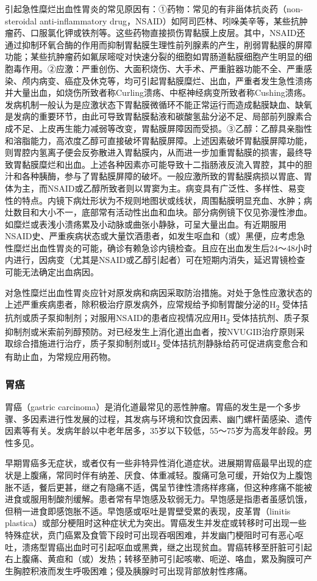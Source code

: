 引起急性糜烂出血性胃炎的常见原因有：①药物：常见的有非甾体抗炎药（non-steroidal
anti-inflammatory
drug，NSAID）如阿司匹林、吲哚美辛等，某些抗肿瘤药、口服氯化钾或铁剂等。这些药物直接损伤胃黏膜上皮层。其中，NSAID还通过抑制环氧合酶的作用而抑制胃黏膜生理性前列腺素的产生，削弱胃黏膜的屏障功能；某些抗肿瘤药如氟尿嘧啶对快速分裂的细胞如胃肠道黏膜细胞产生明显的细胞毒作用。②应激：严重创伤、大面积烧伤、大手术、严重脏器功能不全、严重感染、颅内病变、癌症及休克等，均可引起胃黏膜糜烂、出血，严重者发生急性溃疡并大量出血，如烧伤所致者称Curling溃疡、中枢神经病变所致者称Cushing溃疡。发病机制一般认为是应激状态下胃黏膜微循环不能正常运行而造成黏膜缺血、缺氧是发病的重要环节，由此可导致胃黏膜黏液和碳酸氢盐分泌不足、局部前列腺素合成不足、上皮再生能力减弱等改变，胃黏膜屏障因而受损。③乙醇：乙醇具亲脂性和溶脂能力，高浓度乙醇可直接破坏胃黏膜屏障。上述因素破坏胃黏膜屏障功能，则胃腔内氢离子便会反弥散进入胃黏膜内，从而进一步加重胃黏膜的损害，最终导致胃黏膜糜烂和出血。上述各种因素亦可能导致十二指肠液反流入胃腔，其中的胆汁和各种胰酶，参与了胃黏膜屏障的破坏。一般应激所致的胃黏膜病损以胃底、胃体为主，而NSAID或乙醇所致者则以胃窦为主。病变具有广泛性、多样性、易变性的特点。内镜下病灶形状为不规则地图状或线状，周围黏膜明显充血、水肿；病灶数目和大小不一，底部常有活动性出血和血块。部分病例镜下仅见弥漫性渗血。如糜烂或表浅小溃疡累及小动脉或曲张小静脉，可呈大量出血。有近期服用NSAID史、严重疾病状态或大量饮酒患者，如发生呕血和（或）黑便，应考虑急性糜烂出血性胃炎的可能，确诊有赖急诊内镜检查。且应在出血发生后24～48小时内进行，因病变（尤其是NSAID或乙醇引起者）可在短期内消失，延迟胃镜检查可能无法确定出血病因。

对急性糜烂出血性胃炎应针对原发病和病因采取防治措施。对处于急性应激状态的上述严重疾病患者，除积极治疗原发病外，应常规给予抑制胃酸分泌的H\textsubscript{2}
受体拮抗剂或质子泵抑制剂；对服用NSAID的患者应视情况应用H\textsubscript{2}
受体拮抗剂、质子泵抑制剂或米索前列醇预防。对已经发生上消化道出血者，按NVUGIB治疗原则采取综合措施进行治疗，质子泵抑制剂或H\textsubscript{2}
受体拮抗剂静脉给药可促进病变愈合和有助止血，为常规应用药物。

\subsubsection{胃癌}

胃癌（gastric
carcinoma）是消化道最常见的恶性肿瘤。胃癌的发生是一个多步骤、多因素进行性发展的过程，其发病与环境和饮食因素、幽门螺杆菌感染、遗传因素等有关。发病年龄以中老年居多，35岁以下较低，55～75岁为高发年龄段。男性多见。

早期胃癌多无症状，或者仅有一些非特异性消化道症状。进展期胃癌最早出现的症状是上腹痛，常同时伴有纳差、厌食、体重减轻。腹痛可急可缓，开始仅为上腹饱胀不适，餐后更甚，继之有隐痛不适，偶呈节律性溃疡样疼痛，但这种疼痛不能被进食或服用制酸剂缓解。患者常有早饱感及软弱无力。早饱感是指患者虽感饥饿，但稍一进食即感饱胀不适。早饱感或呕吐是胃壁受累的表现，皮革胃（linitis
plastica）或部分梗阻时这种症状尤为突出。胃癌发生并发症或转移时可出现一些特殊症状，贲门癌累及食管下段时可出现吞咽困难，并发幽门梗阻时可有恶心呕吐，溃疡型胃癌出血时可引起呕血或黑粪，继之出现贫血。胃癌转移至肝脏可引起右上腹痛、黄疸和（或）发热；转移至肺可引起咳嗽、呃逆、咯血，累及胸膜可产生胸腔积液而发生呼吸困难；侵及胰腺时可出现背部放射性疼痛。

